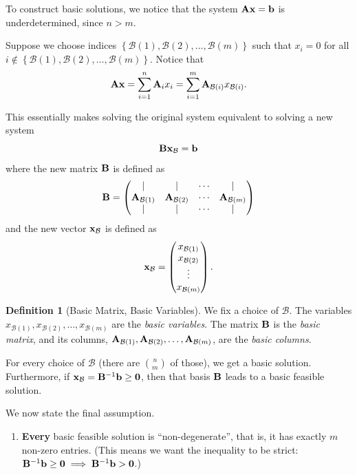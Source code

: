 \documentclass[11pt]{article}
\theoremstyle{definition}
\newtheorem{definition}[theorem]{Definition}
\theoremstyle{remark}
\newcommand{\pqty}[1]{\left(#1\right)}
\newcommand{\Bqty}[1]{\left\{#1\right\}}
\newcommand{\pmqty}[1]{\begin{pmatrix}#1\end{pmatrix}}
\newcommand{\inverse}{^{-1}}
\begin{document}
To construct basic solutions, we notice that the system \(\vb{Ax} = \vb{b}\) is underdetermined, since \(n > m\).

Suppose we choose indices \(\Bqty{\mathcal{B}\pqty{1}, \mathcal{B}\pqty{2}, \ldots, \mathcal{B}\pqty{m}}\) such that \(x_i = 0\) for all \(i \notin \Bqty{\mathcal{B}\pqty{1}, \mathcal{B}\pqty{2}, \ldots, \mathcal{B}\pqty{m}}\). Notice that
\[
    \vb{Ax} = \sum_{i = 1}^{n} \vb{A}_i x_i = \sum_{i = 1}^{m} \vb{A}_{\mathcal{B}\pqty{i}} x_{\mathcal{B}\pqty{i}}.
\]

This essentially makes solving the original system equivalent to solving a new system
\[
    \vb{B} \vb{x}_{\mathcal{B}} = \vb{b}
\]
where the new matrix \(\vb{B}\) is defined as
\[
    \vb{B} = \pmqty{
        | & | & \cdots & | \\
        \vb{A}_{\mathcal{B}\pqty{1}} & \vb{A}_{\mathcal{B}\pqty{2}} & \cdots & \vb{A}_{\mathcal{B}\pqty{m}} \\
        | & | & \cdots & |
    }
\]
and the new vector \(\vb{x}_{\mathcal{B}}\) is defined as
\[
    \vb{x}_{\mathcal{B}} = \pmqty{
        x_{\mathcal{B}\pqty{1}} \\
        x_{\mathcal{B}\pqty{2}} \\
        \vdots \\
        x_{\mathcal{B}\pqty{m}}
    }.
\]

\begin{definition}[Basic Matrix, Basic Variables]\label{optim-unit-0049}
    We fix a choice of \(\mathcal{B}\). The variables \(x_{\mathcal{B}\pqty{1}}, x_{\mathcal{B}\pqty{2}}, \ldots, x_{\mathcal{B}\pqty{m}}\) are the \emph{basic variables}. The matrix \(\vb{B}\) is the \emph{basic matrix}, and its columns, \(\vb{A}_{\mathcal{B}\pqty{1}}, \vb{A}_{\mathcal{B}\pqty{2}}, \ldots, \vb{A}_{\mathcal{B}\pqty{m}}\), are the \emph{basic columns}.
\end{definition}

For every choice of \(\mathcal{B}\) (there are \(\binom{n}{m}\) of those), we get a basic solution. Furthermore, if \(\vb{x}_{\mathcal{B}} = \vb{B}\inverse \vb{b} \geq \vb{0}\), then that basis \(\vb{B}\) leads to a basic feasible solution.

We now state the final assumption.

\begin{enumerate}[resume*]
    \item \textbf{Every} basic feasible solution is ``non-degenerate'', that is, it has exactly \(m\) non-zero entries. (This means we want the inequality to be strict: \(\vb{B}\inverse \vb{b} \geq \vb{0} \implies \vb{B}\inverse \vb{b} > \vb{0}\).)
\end{enumerate}
\end{document}
